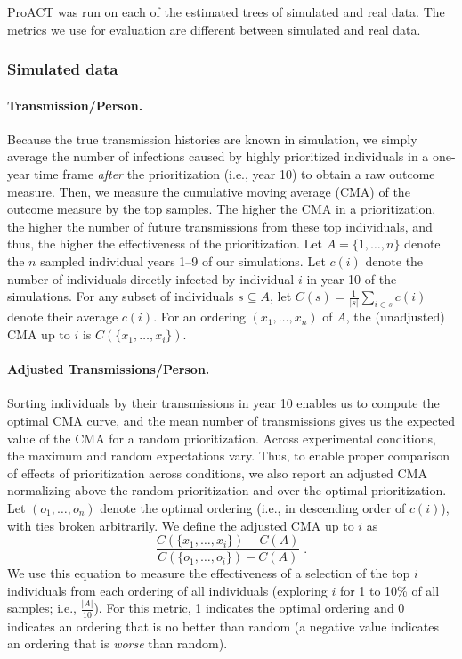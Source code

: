 \documentclass[a4paper,11pt]{article}
\newcommand{\PLWH}{sample\xspace}
\begin{document}
ProACT was run on each of the estimated trees of simulated and real data.
The metrics we use for evaluation are different between simulated and real data. 

\subsubsection{Simulated data}

\paragraph{Transmission/Person.}
Because the true transmission histories are known in simulation,
we simply average the number of infections caused by highly prioritized individuals in a one-year time frame \textit{after} the  prioritization (i.e., year 10)
to obtain a raw outcome measure.
Then, we measure the cumulative moving average (CMA) of the outcome measure by the top \PLWH{s}. 
The higher the CMA in a prioritization, the higher the number of future transmissions from these {top} individuals, and thus, the higher the effectiveness of the prioritization. 
Let $A=\{1,\ldots,n\}$ denote the %
$n$
sampled individual years 1--9 of our simulations. 
Let $c(i)$ denote the number of individuals directly infected by individual $i$ in year 10 of the simulations. 
For any subset of individuals $s\subseteq A$, let $C(s)=\frac{1}{|s|}\sum_{i\in s}{c(i)}$ denote their average $c(i)$.
For an ordering $(x_1,\ldots,x_n)$  of $A$, the (unadjusted) CMA up to $i$ is $C\left(\{x_1,\ldots,x_i\}\right)$.



\paragraph{Adjusted Transmissions/Person.} 
Sorting individuals by their transmissions in year 10  enables us to compute the optimal CMA curve, and the mean number of transmissions gives us the expected value of the CMA for a random prioritization.
Across experimental conditions, the maximum and random expectations vary.
Thus, to enable proper comparison of {effects of prioritization} across conditions,
we also report an adjusted CMA normalizing above the random prioritization and over the optimal prioritization.
Let $(o_1,\ldots,o_n)$ denote the optimal ordering (i.e., in descending order of $c(i)$), with ties broken arbitrarily. 
We define the adjusted CMA up to $i$ as
\begin{equation*}%
    \frac{C\left(\{x_1,\ldots,x_i\}\right)-C(A)}{C\left(\{o_1,\ldots,o_i\}\right)-C(A)}\; .
\end{equation*}
We use this equation to measure the effectiveness of a selection of the top $i$ individuals from each ordering of all individuals (exploring $i$ for 1 to 10\% of all  samples; i.e., $\frac{|A|}{10}$). 
For this  metric, 1 indicates the optimal ordering and 0 indicates an ordering that is no better than random (a negative value indicates an ordering that is \textit{worse} than random). 
\end{document}
